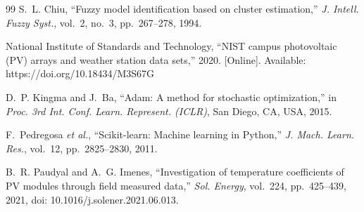 \documentclass[11pt,a4paper]{article}
\begin{document}
\begin{thebibliography}{99}
S.~L. Chiu, ``Fuzzy model identification based on cluster estimation,'' \emph{J. Intell. Fuzzy Syst.}, vol.~2, no.~3, pp.~267--278, 1994.

National Institute of Standards and Technology, ``NIST campus photovoltaic (PV) arrays and weather station data sets,'' 2020. [Online]. Available: https://doi.org/10.18434/M3S67G

D.~P. Kingma and J.~Ba, ``Adam: A method for stochastic optimization,'' in \emph{Proc. 3rd Int. Conf. Learn. Represent. (ICLR)}, San Diego, CA, USA, 2015.

F.~Pedregosa \emph{et al.}, ``Scikit-learn: Machine learning in Python,'' \emph{J. Mach. Learn. Res.}, vol.~12, pp.~2825--2830, 2011.

B.~R. Paudyal and A.~G. Imenes, ``Investigation of temperature coefficients of PV modules through field measured data,'' \emph{Sol. Energy}, vol.~224, pp.~425--439, 2021, doi: 10.1016/j.solener.2021.06.013.

\end{thebibliography}
\end{document}
